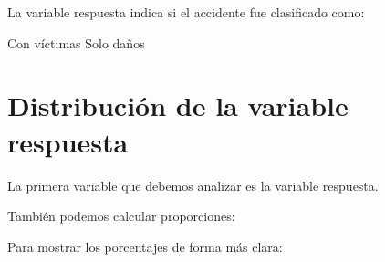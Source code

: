 \documentclass[
  11pt,
  letterpaper,
]{book}
\newenvironment{Shaded}{\begin{snugshade}}{\end{snugshade}}
\newcommand{\ControlFlowTok}[1]{\textcolor[rgb]{0.00,0.23,0.31}{\textbf{#1}}}
\newcommand{\DecValTok}[1]{\textcolor[rgb]{0.68,0.00,0.00}{#1}}
\newcommand{\FunctionTok}[1]{\textcolor[rgb]{0.28,0.35,0.67}{#1}}
\newcommand{\NormalTok}[1]{\textcolor[rgb]{0.00,0.23,0.31}{#1}}
\newcommand{\SpecialCharTok}[1]{\textcolor[rgb]{0.37,0.37,0.37}{#1}}
\begin{document}
La variable respuesta indica si el accidente fue clasificado como:

\begin{Shaded}
\begin{Highlighting}[]
\NormalTok{Con víctimas}
\NormalTok{Solo daños}
\end{Highlighting}
\end{Shaded}

\section{Distribución de la variable
respuesta}\label{distribuciuxf3n-de-la-variable-respuesta}

La primera variable que debemos analizar es la variable respuesta.

\begin{Shaded}
\end{Shaded}

También podemos calcular proporciones:

\begin{Shaded}
\end{Shaded}

Para mostrar los porcentajes de forma más clara:

\begin{Shaded}
\end{Shaded}
\end{document}
